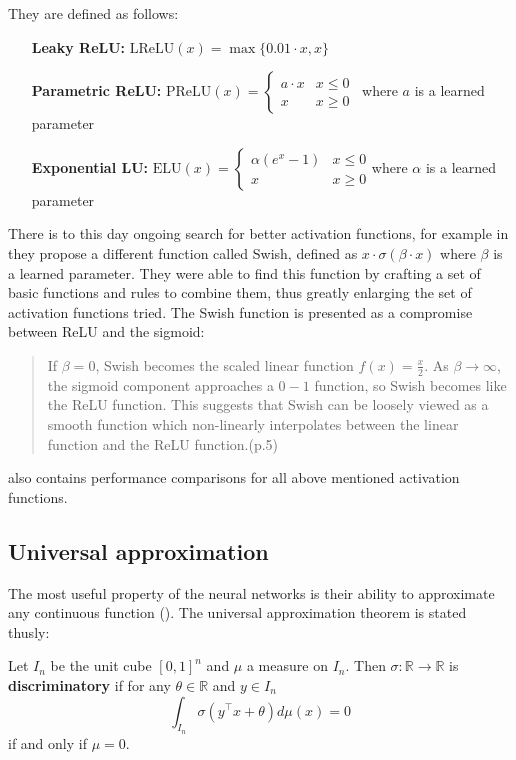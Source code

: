They are defined as follows:
\begin{itemize}
\item[\textbf{Leaky ReLU:}] $\text{LReLU}(x)=\max\{0.01\cdot x,x\}$
\item[\textbf{Parametric ReLU:}] $\text{PReLU}(x)=
\begin{cases} 
      a\cdot x & x\leq 0 \\
      x & x\geq 0
   \end{cases}$\ where $a$ is a learned parameter
\item[\textbf{Exponential LU:}] $\text{ELU}(x)=
\begin{cases} 
      \alpha(e^x-1) & x\leq 0 \\
      x & x\geq 0
   \end{cases}
$where $\alpha$ is a learned parameter
\end{itemize}

There is to this day ongoing search for better activation functions, for example in  \cite{swish} they propose a different function called Swish, defined as $x\cdot \sigma(\beta\cdot x)$ where $\beta$ is a learned parameter. They were able to find this function by crafting a set of basic functions and rules to combine them, thus greatly enlarging the set of activation functions tried. The Swish function is presented as a compromise between ReLU and the sigmoid:
\begin{quote}
If $\beta=0$, Swish becomes the scaled linear function $f(x)=\frac{x}{2}$. As $\beta\rightarrow\infty$,  the sigmoid component approaches a $0-1$ function,  so Swish becomes like the ReLU function. This suggests that Swish can be loosely viewed as a smooth function which non-linearly interpolates between the linear function and the ReLU function.(p.5)
\end{quote}

\cite{swish} also contains performance comparisons for all above mentioned activation functions.

\subsection{Universal approximation}

The most useful property of the neural networks is their ability to approximate any continuous function (\cite{universal}). The universal approximation theorem is stated thusly:

\begin{defn}
 Let $I_n$ be the unit cube $[0,1]^n$ and $\mu$ a measure on $I_n$. Then $\sigma:\mathbb{R}\rightarrow\mathbb{R}$ is \textbf{discriminatory} if for any $\theta\in\mathbb{R}$ and $y\in I_n$ $$\int_{I_n}\sigma(y^\top x+\theta)d\mu(x)=0$$ if and only if $\mu=0$.
\end{defn}

